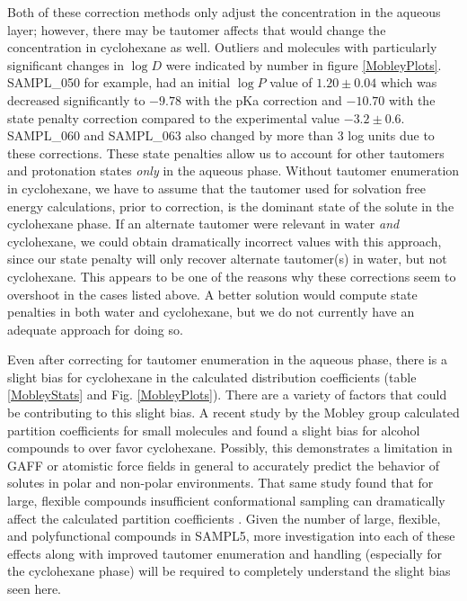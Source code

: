Both of these correction methods only adjust the concentration in the aqueous layer; however, there may be tautomer affects that would change the concentration in cyclohexane as well.
Outliers and molecules with particularly significant changes in $\log D$ were indicated by number in figure \ref{MobleyPlots}. 
SAMPL\_050 for example, had an initial $\log P$ value of $1.20 \pm 0.04$ which was decreased significantly to $-9.78$ with the pKa correction and $-10.70$ 
with the state penalty correction compared to the experimental value $-3.2 \pm 0.6$. 
SAMPL\_060 and SAMPL\_063 also changed by more than 3 log units due to these corrections. 
These state penalties allow us to account for other tautomers and protonation states \emph{only} in the aqueous phase.
Without tautomer enumeration in cyclohexane, we have to assume that the tautomer used for solvation free energy calculations, prior to correction, is the dominant state of the solute in the cyclohexane phase. 
If an alternate tautomer were relevant in water \emph{and} cyclohexane, we could obtain dramatically incorrect values with this approach, since our state penalty will only recover alternate tautomer(s) in water, but not cyclohexane. 
This appears to be one of the reasons why these corrections seem to overshoot in the cases listed above. 
A better solution would compute state penalties in both water and cyclohexane, but we do not currently have an adequate approach for doing so. 

Even after correcting for tautomer enumeration in the aqueous phase, there is a slight bias for cyclohexane in the calculated distribution coefficients (table \ref{MobleyStats} and Fig. \ref{MobleyPlots}). 
There are a variety of factors that could be contributing to this slight bias. 
A recent study by the Mobley group calculated partition coefficients for small molecules and found a slight bias for alcohol compounds to over favor cyclohexane\cite{Bannan:2016lp}.
Possibly, this demonstrates a limitation in GAFF or atomistic force fields in general to accurately predict the behavior of solutes in polar and non-polar environments. 
That same study found that for large, flexible compounds insufficient conformational sampling can dramatically affect the calculated partition coefficients \cite{Bannan:2016lp}. 
Given the number of large, flexible, and polyfunctional compounds in SAMPL5, more investigation into each of these effects along with improved tautomer enumeration and handling (especially for the cyclohexane phase) will be required to completely understand the slight bias seen here. 

